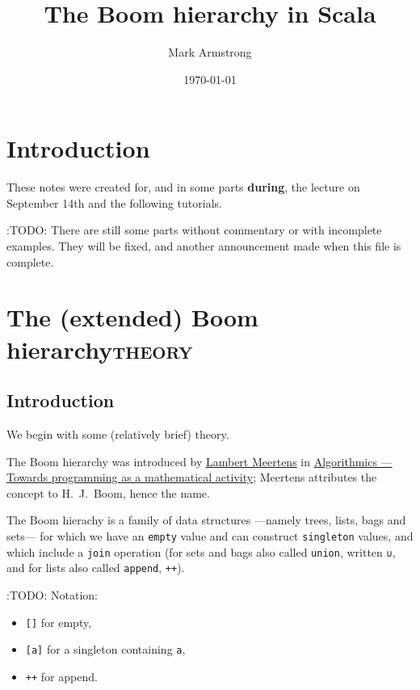 \documentclass[11pt]{article}
\author{Mark Armstrong}
\date{\today}
\title{The Boom hierarchy in Scala}
\begin{document}
\maketitle
\tableofcontents


\section{Introduction}
\label{sec:orgce555ad}
These notes were created for, and in some parts \textbf{during},
the lecture on September 14th and the following tutorials.

:TODO: There are still some parts without commentary or with incomplete examples.
They will be fixed, and another announcement made when this file is complete.

\section{The (extended) Boom hierarchy\hfill{}\textsc{theory}}
\label{sec:orgb792d1b}
\subsection{Introduction}
\label{sec:org1a6ed54}
We begin with some (relatively brief) theory.

The Boom hierarchy was introduced
by \href{https://www.kestrel.edu/people/meertens/publications/}{Lambert Meertens} in
\href{https://www.kestrel.edu/people/meertens/publications/papers/Algorithmics.pdf}{Algorithmics — Towards programming as a mathematical activity};
Meertens attributes the concept to H. J. Boom, hence the name.

The Boom hierachy is a family of data structures
—namely trees, lists, bags and sets—
for which we have an \texttt{empty} value and can construct \texttt{singleton} values,
and which include a \texttt{join} operation
(for sets and bags also called \texttt{union}, written \texttt{∪},
and for lists also called \texttt{append}, \texttt{++}).

:TODO:
Notation:
\begin{itemize}
\item \texttt{[]} for empty,
\item \texttt{[a]} for a singleton containing \texttt{a},
\item \texttt{++} for append.
\end{itemize}
\end{document}
